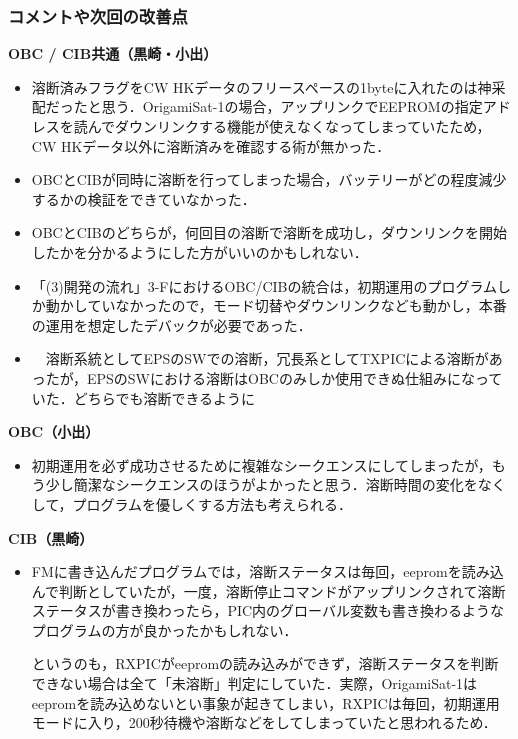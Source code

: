 \subsubsection{コメントや次回の改善点}
\hspace{2ex}
\textbf{OBC / CIB共通（黒崎・小出）}
\begin{itemize}
	\item 溶断済みフラグをCW HKデータのフリースペースの1byteに入れたのは神采配だったと思う．OrigamiSat-1の場合，アップリンクでEEPROMの指定アドレスを読んでダウンリンクする機能が使えなくなってしまっていたため，CW HKデータ以外に溶断済みを確認する術が無かった．
	\item OBCとCIBが同時に溶断を行ってしまった場合，バッテリーがどの程度減少するかの検証をできていなかった．
	\item OBCとCIBのどちらが，何回目の溶断で溶断を成功し，ダウンリンクを開始したかを分かるようにした方がいいのかもしれない．
	\item 「(3)開発の流れ」3-FにおけるOBC/CIBの統合は，初期運用のプログラムしか動かしていなかったので，モード切替やダウンリンクなども動かし，本番の運用を想定したデバックが必要であった．
	\item　溶断系統としてEPSのSWでの溶断，冗長系としてTXPICによる溶断があったが，EPSのSWにおける溶断はOBCのみしか使用できぬ仕組みになっていた．どちらでも溶断できるように
\end{itemize}

\hspace{2ex}
\textbf{OBC（小出）}
\begin{itemize}
	\item 初期運用を必ず成功させるために複雑なシークエンスにしてしまったが，もう少し簡潔なシークエンスのほうがよかったと思う．溶断時間の変化をなくして，プログラムを優しくする方法も考えられる．
\end{itemize}

\hspace{2ex}
\textbf{CIB（黒崎）}
\begin{itemize}
	\item FMに書き込んだプログラムでは，溶断ステータスは毎回，eepromを読み込んで判断としていたが，一度，溶断停止コマンドがアップリンクされて溶断ステータスが書き換わったら，PIC内のグローバル変数も書き換わるようなプログラムの方が良かったかもしれない．
	
	というのも，RXPICがeepromの読み込みができず，溶断ステータスを判断できない場合は全て「未溶断」判定にしていた．実際，OrigamiSat-1はeepromを読み込めないとい事象が起きてしまい，RXPICは毎回，初期運用モードに入り，200秒待機や溶断などをしてしまっていたと思われるため．
\end{itemize}
